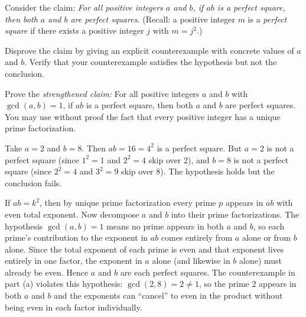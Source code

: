 \documentclass[test,letterpaper]{cs20}
\begin{document}
\begin{problem}

Consider the claim: \emph{For all positive integers $a$ and $b$, if $ab$ is a perfect square, then both $a$ and $b$ are perfect squares.} (Recall: a positive integer $m$ is a \emph{perfect square} if there exists a positive integer $j$ with $m = j^2$.)

\subproblem Disprove the claim by giving an explicit counterexample with concrete values of $a$ and $b$. Verify that your counterexample satisfies the hypothesis but not the conclusion.

\subproblem Prove the \emph{strengthened claim:} For all positive integers $a$ and $b$ with $\gcd(a, b) = 1$, if $ab$ is a perfect square, then both $a$ and $b$ are perfect squares. You may use without proof the fact that every positive integer has a unique prime factorization.

\begin{solution}
\subsolution Take $a = 2$ and $b = 8$. Then $ab = 16 = 4^2$ is a perfect square. But $a = 2$ is not a perfect square (since $1^2 = 1$ and $2^2 = 4$ skip over 2), and $b = 8$ is not a perfect square (since $2^2 = 4$ and $3^2 = 9$ skip over 8). The hypothesis holds but the conclusion fails.

\subsolution If $ab = k^2$, then by unique prime factorization every prime $p$ appears in $ab$ with even total exponent. Now decompose $a$ and $b$ into their prime factorizations. The hypothesis $\gcd(a,b) = 1$ means no prime appears in both $a$ and $b$, so each prime's contribution to the exponent in $ab$ comes entirely from $a$ alone or from $b$ alone. Since the total exponent of each prime is even and that exponent lives entirely in one factor, the exponent in $a$ alone (and likewise in $b$ alone) must already be even. Hence $a$ and $b$ are each perfect squares. The counterexample in part (a) violates this hypothesis: $\gcd(2, 8) = 2 \neq 1$, so the prime $2$ appears in both $a$ and $b$ and the exponents can ``cancel'' to even in the product without being even in each factor individually.
\end{solution}

\pagebreak

\end{problem}
\end{document}
